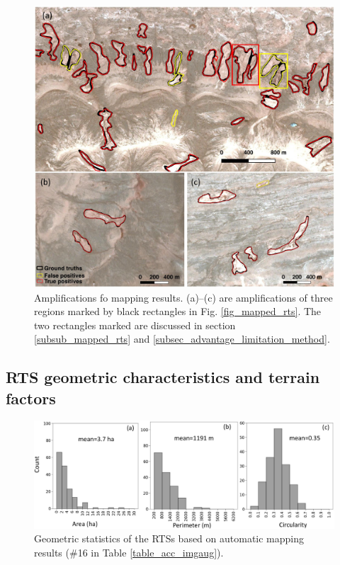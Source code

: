 \documentclass[preprint,12pt,authoryear]{elsarticle}
\begin{document}
\begin{figure}
	\centering
	\includegraphics[width=12cm]{figures/zoom_in_mapped_polygons_trim.jpg}
	\caption{Amplifications fo mapping results. (a)--(c) are amplifications of three regions marked by black rectangles in Fig. \ref{fig_mapped_rts}. The two rectangles marked are discussed in section \ref{subsub_mapped_rts} and \ref{subsec_advantage_limitation_method}.}
	\label{fig_zoomin_mapped_rts}
\end{figure}

\subsection{RTS geometric characteristics and terrain factors}
\label{subsub_chara_terrain}

\begin{figure}
	\centering
	\includegraphics[width=14cm]{figures/geometric_var_mapped_trim.jpg}
	\caption{Geometric statistics of the RTSs based on automatic mapping results (\#16 in Table \ref{table_acc_imgaug}). }
	\label{fig_geometric_statistics}
\end{figure}
\end{document}
